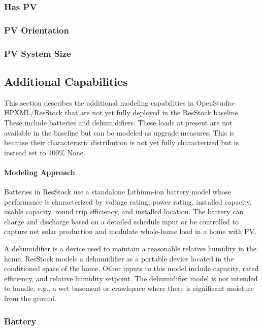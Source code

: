 \subsubsection{Has PV} \label{sec:has_pv}


\subsubsection{PV Orientation}  \label{sec:pv_orientation}


\subsubsection{PV System Size} \label{sec:pv_system_size}


\subsection{Additional Capabilities}
This section describes the additional modeling capabilities in OpenStudio-HPXML/ResStock that are not yet fully deployed in the ResStock baseline. These include batteries and dehumidifiers. These loads at present are not available in the baseline but can be modeled as upgrade measures. This is because their characteristic distribution is not yet fully characterized but is instead set to 100\% None.

\paragraph{Modeling Approach}
Batteries in ResStock use a standalone Lithium-ion battery model whose performance is characterized by voltage rating, power rating, installed capacity, usable capacity, round trip efficiency, and installed location. The battery can charge and discharge based on a detailed schedule input or be controlled to capture net solar production and modulate whole-home load in a home with PV.

A dehumidifier is a device used to maintain a reasonable relative humidity in the home. ResStock models a dehumidifier as a portable device located in the conditioned space of the home. Other inputs to this model include capacity, rated efficiency, and relative humidity setpoint. The dehumidifier model is not intended to handle, e.g., a wet basement or crawlspace where there is significant moisture from the ground.

\subsubsection{Battery}


